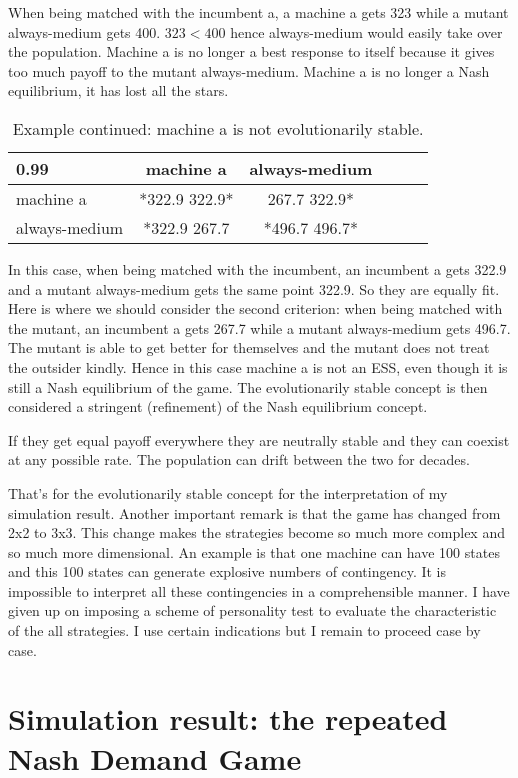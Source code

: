 \documentclass[12.5pt]{report}
\begin{document}
When being matched with the incumbent a, a machine a gets 323 while a mutant always-medium gets 400. $323 < 400$ hence always-medium would easily take over the population. Machine a is no longer a best response to itself because it gives too much payoff to the mutant always-medium. Machine a is no longer a Nash equilibrium, it has lost all the stars.

\begin{table}[h!]
\center
\begin{tabular}{l|ccccc}
\textbf{0.99}& machine a & always-medium \\
\hline
machine a & *322.9 322.9* &   267.7 322.9*   \\
always-medium  &  *322.9 267.7  &    *496.7 496.7*  \\
\end{tabular}
\caption{Example continued: machine a is not evolutionarily stable.}
\end{table}

In this case, when being matched with the incumbent, an incumbent a gets 322.9 and a mutant always-medium gets the same point 322.9. So they are equally fit. Here is where we should consider the second criterion: when being matched with the mutant, an incumbent a gets 267.7 while a mutant always-medium gets 496.7. The mutant is able to get better for themselves and the mutant does not treat the outsider kindly. Hence in this case machine a is not an ESS, even though it is still a Nash equilibrium of the game. The evolutionarily stable concept is then considered a stringent (refinement) of the Nash equilibrium concept.

If they get equal payoff everywhere they are neutrally stable and they can coexist at any possible rate. The population can drift between the two for decades.

That's for the evolutionarily stable concept for the interpretation of my simulation result. Another important remark is that the game has changed from 2x2 to 3x3. This change makes the strategies become so much more complex and so much more dimensional. An example is that one machine can have 100 states and this 100 states can generate explosive numbers of contingency. It is impossible to interpret all these contingencies in a comprehensible manner. I have given up on imposing a scheme of personality test to evaluate the characteristic of the all strategies. I use certain indications but I remain to proceed case by case.\\

\chapter{Simulation result: the repeated Nash Demand Game}
\end{document}
